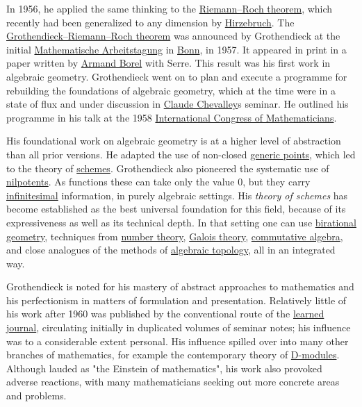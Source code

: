 In 1956, he applied the same thinking to the \href{https://en.wikipedia.org/wiki/Riemann–Roch_theorem}{Riemann--Roch theorem}, which recently had been generalized to any dimension by \href{https://en.wikipedia.org/wiki/Friedrich_Hirzebruch}{Hirzebruch}. The \href{https://en.wikipedia.org/wiki/Grothendieck–Riemann–Roch_theorem}{Grothendieck--Riemann--Roch theorem} was announced by Grothendieck at the initial \href{https://en.wikipedia.org/wiki/Mathematische_Arbeitstagung}{Mathematische Arbeitstagung} in \href{https://en.wikipedia.org/wiki/Bonn}{Bonn}, in 1957. It appeared in print in a paper written by \href{https://en.wikipedia.org/wiki/Armand_Borel}{Armand Borel} with Serre. This result was his first work in algebraic geometry. Grothendieck went on to plan and execute a programme for rebuilding the foundations of algebraic geometry, which at the time were in a state of flux and under discussion in \href{https://en.wikipedia.org/wiki/Claude_Chevalley}{Claude Chevalley}\textquotesingle s seminar. He outlined his programme in his talk at the 1958 \href{https://en.wikipedia.org/wiki/International_Congress_of_Mathematicians}{International Congress of Mathematicians}.

His foundational work on algebraic geometry is at a higher level of abstraction than all prior versions. He adapted the use of non-closed \href{https://en.wikipedia.org/wiki/Generic_point}{generic points}, which led to the theory of \href{https://en.wikipedia.org/wiki/Scheme_(mathematics)}{schemes}. Grothendieck also pioneered the systematic use of \href{https://en.wikipedia.org/wiki/Nilpotent}{nilpotents}. As \textquotesingle functions\textquotesingle{} these can take only the value 0, but they carry \href{https://en.wikipedia.org/wiki/Infinitesimal}{infinitesimal} information, in purely algebraic settings. His \emph{theory of schemes} has become established as the best universal foundation for this field, because of its expressiveness as well as its technical depth. In that setting one can use \href{https://en.wikipedia.org/wiki/Birational_geometry}{birational geometry}, techniques from \href{https://en.wikipedia.org/wiki/Number_theory}{number theory}, \href{https://en.wikipedia.org/wiki/Galois_theory}{Galois theory}, \href{https://en.wikipedia.org/wiki/Commutative_algebra}{commutative algebra}, and close analogues of the methods of \href{https://en.wikipedia.org/wiki/Algebraic_topology}{algebraic topology}, all in an integrated way.

Grothendieck is noted for his mastery of abstract approaches to mathematics and his perfectionism in matters of formulation and presentation. Relatively little of his work after 1960 was published by the conventional route of the \href{https://en.wikipedia.org/wiki/Learned_journal}{learned journal}, circulating initially in duplicated volumes of seminar notes; his influence was to a considerable extent personal. His influence spilled over into many other branches of mathematics, for example the contemporary theory of \href{https://en.wikipedia.org/wiki/D-module}{D-modules}. Although lauded as "the Einstein of mathematics", his work also provoked adverse reactions, with many mathematicians seeking out more concrete areas and problems.



